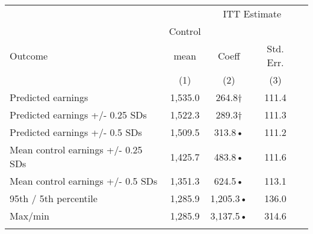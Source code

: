\begin{tabular}{lcccc}
\hline \noalign{\smallskip} &  & \multicolumn{2}{c}{{ ITT Estimate}} & \\
\cline{3-4} & Control &  &  & \\
Outcome & mean & Coeff & Std. Err. & \\
 & (1) & (2) & (3) & \\
\noalign{\smallskip}\hline \noalign{\smallskip}Predicted earnings & 1,535.0 & 264.8† & 111.4 & \\
Predicted earnings +/- 0.25 SDs & 1,522.3 & 289.3† & 111.3 & \\
Predicted earnings +/- 0.5 SDs & 1,509.5 & 313.8• & 111.2 & \\
Mean control earnings +/- 0.25 SDs & 1,425.7 & 483.8• & 111.6 & \\
Mean control earnings +/- 0.5 SDs & 1,351.3 & 624.5• & 113.1 & \\
95th / 5th percentile & 1,285.9 & 1,205.3• & 136.0 & \\
Max/min & 1,285.9 & 3,137.5• & 314.6 & \\
\noalign{\smallskip}\hline\end{tabular}\\
